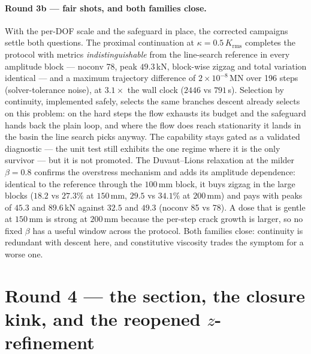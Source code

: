\paragraph{Round 3b --- fair shots, and both families close.} With
the per-DOF scale and the safeguard in place, the corrected campaigns
settle both questions. The proximal continuation at
$\kappa = 0.5\,K_{\mathrm{rms}}$ completes the protocol with metrics
\emph{indistinguishable} from the line-search reference in every
amplitude block --- noconv 78, peak $49.3$\,kN, block-wise zigzag and
total variation identical --- and a maximum trajectory difference of
$2\times 10^{-8}$\,MN over 196 steps (solver-tolerance noise), at
$3.1\times$ the wall clock ($2446$ vs $791$\,s). Selection by
continuity, implemented safely, selects the same branches descent
already selects on this problem: on the hard steps the flow exhausts
its budget and the safeguard hands back the plain loop, and where the
flow does reach stationarity it lands in the basin the line search
picks anyway. The capability stays gated as a validated diagnostic ---
the unit test still exhibits the one regime where it is the only
survivor --- but it is not promoted. The Duvaut--Lions relaxation at
the milder $\beta = 0.8$ confirms the overstress mechanism and adds
its amplitude dependence: identical to the reference through the
$100$\,mm block, it buys zigzag in the large blocks ($18.2$ vs
$27.3\%$ at $150$\,mm, $29.5$ vs $34.1\%$ at $200$\,mm) and pays with
peaks of $45.3$ and $89.6$\,kN against $32.5$ and $49.3$ (noconv 85
vs 78). A dose that is gentle at $150$\,mm is strong at $200$\,mm
because the per-step crack growth is larger, so no fixed $\beta$ has
a useful window across the protocol. Both families close: continuity
is redundant with descent here, and constitutive viscosity trades the
symptom for a worse one.

\section{Round 4 --- the section, the closure kink, and the reopened
$z$-refinement}
\label{sec:kb-round4}

